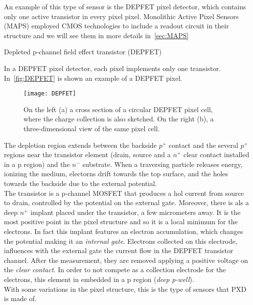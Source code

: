 An example of this type of sensor is the DEPFET pixel detector, which contains only one active transistor in every pixel pixel. Monolithic Active Pixel Sensors (MAPS) employed CMOS technologies to include a readout circuit in their structure and we will see them in more details in~\autoref{sec:MAPS}

\begin{description}
\item[Depleted p-channel field effect transistor (DEPFET)]
\end{description}

In a DEPFET pixel detector, each pixel implements only one transistor. In~\autoref{fig:DEPFET} is shown an example of a DEPFET pixel.

\begin{figure}[h!]
\centering
\texttt{[image: DEPFET]}
\caption{On the left (a) a cross section of a circular DEPFET pixel cell, where the charge collection is also sketched. On the right (b), a three-dimensional view of the same pixel cell.}
\label{fig:DEPFET}
\end{figure}

The depletion region extends between the backside $p^{+}$ contact and the several $p^{+}$ regions near the transistor element (drain, source and a $n^{+}$ clear contact installed in a p region) and the $n^{-}$ substrate. When a traversing particle releases energy, ionizing the medium, electorns drift towards the top surface, and the holes towards the backside due to the external potential.\\
The transistor is a p-channel MOSFET that produces a hol current from source to drain, controlled by the potential on the external gate. Moreover, there is als a deep $n^{+}$ implant placed under the transistor, a few micrometers away. It is the most positive point in the pixel structure and so it is a local minimum for the electrons. In fact this implant features an electron accumulation, which changes the potential making it an \textit{internal gate}. 
Electrons collected on this electrode, influences with the external gate the current flow in the DEPFET transistor channel. After the measurement, they are removed applying a positive voltage on the \textit{clear contact}. In order to not compete as a collection electrode for the electrons, this element in embedded in a p region (\textit{deep p-well}).\\
With some variations in the pixel structure, this is the type of sensors that PXD is made of.

